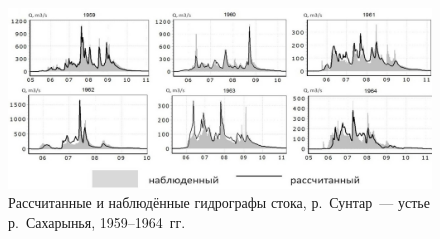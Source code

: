 \begin{figure}[h!]
\begin{changemargin}{-1.25cm}{0cm}
  \begin{center}
    \includegraphics[width=1.2\textwidth]{authors/nesterova-1-fig-2.jpg}
  \end{center}
\end{changemargin}
  \caption{Рассчитанные и наблюдённые гидрографы стока, р.~Сунтар~--- устье
р.~Сахарынья, 1959--1964~гг.}
  \label{fig:nesterova-1-fig-2}
\end{figure}
